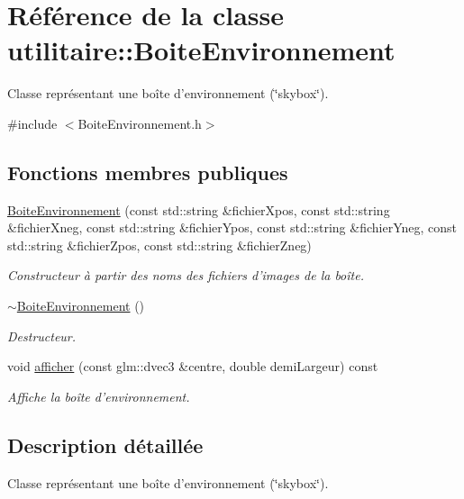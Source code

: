 \hypertarget{classutilitaire_1_1_boite_environnement}{\section{Référence de la classe utilitaire\-:\-:Boite\-Environnement}
\label{classutilitaire_1_1_boite_environnement}
}


Classe représentant une boîte d'environnement (\char`\"{}skybox\char`\"{}).  




{\ttfamily \#include $<$Boite\-Environnement.\-h$>$}

\subsection*{Fonctions membres publiques}
\begin{DoxyCompactItemize}
\item 
\hyperlink{classutilitaire_1_1_boite_environnement_afa2e429fd77f584d9b07e1577b907f7b}{Boite\-Environnement} (const std\-::string \&fichier\-Xpos, const std\-::string \&fichier\-Xneg, const std\-::string \&fichier\-Ypos, const std\-::string \&fichier\-Yneg, const std\-::string \&fichier\-Zpos, const std\-::string \&fichier\-Zneg)
\begin{DoxyCompactList}\small\item\em Constructeur à partir des noms des fichiers d'images de la boîte. \end{DoxyCompactList}\item 
\hyperlink{classutilitaire_1_1_boite_environnement_accfe35d5a88904e5001653142b985a27}{$\sim$\-Boite\-Environnement} ()
\begin{DoxyCompactList}\small\item\em Destructeur. \end{DoxyCompactList}\item 
void \hyperlink{classutilitaire_1_1_boite_environnement_a41246ea752945870645cfbd5aec673e9}{afficher} (const glm\-::dvec3 \&centre, double demi\-Largeur) const 
\begin{DoxyCompactList}\small\item\em Affiche la boîte d'environnement. \end{DoxyCompactList}\end{DoxyCompactItemize}


\subsection{Description détaillée}
Classe représentant une boîte d'environnement (\char`\"{}skybox\char`\"{}). 


